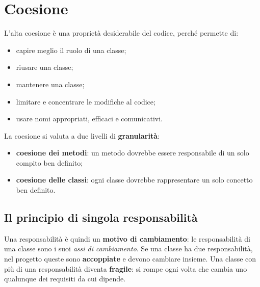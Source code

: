 \section{Coesione}


L'alta coesione è una proprietà desiderabile del codice, perché permette di:
\begin{itemize}
  \item capire meglio il ruolo di una classe;
  \item riusare una classe;
  \item mantenere una classe;
  \item limitare e concentrare le modifiche al codice;
  \item usare nomi appropriati, efficaci e comunicativi.
\end{itemize}

La coesione si valuta a due livelli di \textbf{granularità}:
\begin{itemize}
  \item \textbf{coesione dei metodi}: un metodo dovrebbe essere responsabile di un solo compito ben definito;
  \item \textbf{coesione delle classi}: ogni classe dovrebbe rappresentare un solo concetto ben definito.
\end{itemize}

\subsection{Il principio di singola responsabilità}


Una responsabilità è quindi un \textbf{motivo di cambiamento}: le responsabilità di una classe sono i suoi \textit{assi di
cambiamento}. Se una classe ha due responsabilità, nel progetto queste sono \textbf{accoppiate} e devono cambiare insieme.
Una classe con più di una responsabilità diventa \textbf{fragile}: si rompe ogni volta che cambia uno qualunque dei
requisiti da cui dipende.

